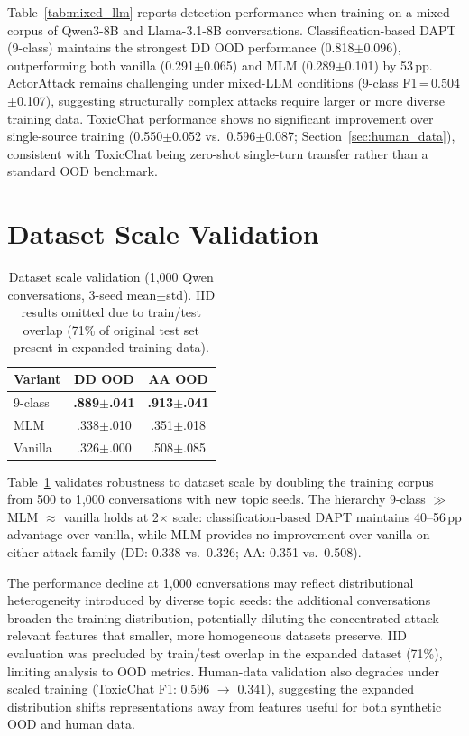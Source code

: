 Table~\ref{tab:mixed_llm} reports detection performance when training on a mixed corpus of Qwen3-8B and Llama-3.1-8B conversations. Classification-based DAPT (9-class) maintains the strongest DD OOD performance (0.818$\pm$0.096), outperforming both vanilla (0.291$\pm$0.065) and MLM (0.289$\pm$0.101) by 53\,pp. ActorAttack remains challenging under mixed-LLM conditions (9-class F1\,=\,0.504$\pm$0.107), suggesting structurally complex attacks require larger or more diverse training data. ToxicChat performance shows no significant improvement over single-source training (0.550$\pm$0.052 vs.\ 0.596$\pm$0.087; Section~\ref{sec:human_data}), consistent with ToxicChat being zero-shot single-turn transfer rather than a standard OOD benchmark.

\section{Dataset Scale Validation}
\label{app:scale_validation}

\begin{table}[ht]
\centering
\footnotesize
\caption{Dataset scale validation (1{,}000 Qwen conversations, 3-seed mean$\pm$std). IID results omitted due to train/test overlap (71\% of original test set present in expanded training data).}
\label{tab:scale_validation}
\begin{tabular}{@{}lcc@{}}
\toprule
\textbf{Variant} & DD OOD & AA OOD \\
\midrule
9-class & \textbf{.889$\pm$.041} & \textbf{.913$\pm$.041} \\
MLM & .338$\pm$.010 & .351$\pm$.018 \\
Vanilla & .326$\pm$.000 & .508$\pm$.085 \\
\bottomrule
\end{tabular}
\end{table}

Table~\ref{tab:scale_validation} validates robustness to dataset scale by doubling the training corpus from 500 to 1{,}000 conversations with new topic seeds. The hierarchy 9-class $\gg$ MLM $\approx$ vanilla holds at 2$\times$ scale: classification-based DAPT maintains 40--56\,pp advantage over vanilla, while MLM provides no improvement over vanilla on either attack family (DD: 0.338 vs.\ 0.326; AA: 0.351 vs.\ 0.508).

The performance decline at 1{,}000 conversations may reflect distributional heterogeneity introduced by diverse topic seeds: the additional conversations broaden the training distribution, potentially diluting the concentrated attack-relevant features that smaller, more homogeneous datasets preserve. IID evaluation was precluded by train/test overlap in the expanded dataset (71\%), limiting analysis to OOD metrics. Human-data validation also degrades under scaled training (ToxicChat F1: 0.596 $\to$ 0.341), suggesting the expanded distribution shifts representations away from features useful for both synthetic OOD and human data.

